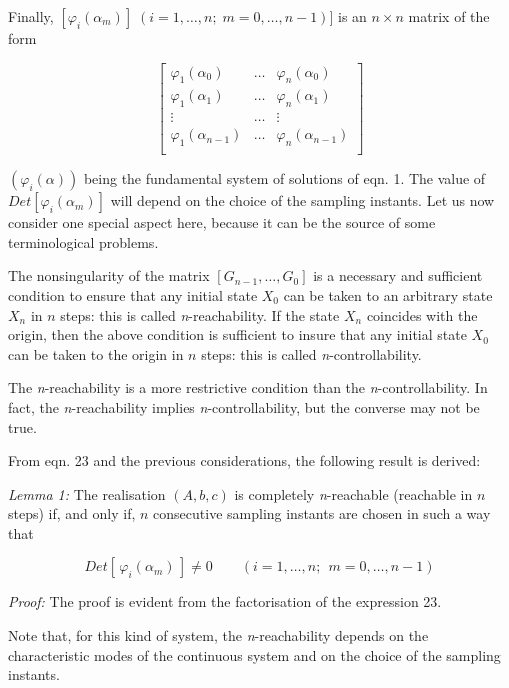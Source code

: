 \documentclass{article}
\begin{document}
Finally, $[\varphi_i(\alpha_m)] \; (i = 1, \ldots , n; \; m = 0,
\ldots , n - 1)]$ is an $n \times n$ matrix of the form


\begin{equation}\label{eq:27}
\left[\begin{array}{ccc}
  \varphi_1(\alpha_0) & \ldots & \varphi_n(\alpha_0) \\
  \varphi_1(\alpha_1) & \ldots & \varphi_n(\alpha_1) \\
  \vdots & \ldots & \vdots \\
  \varphi_1(\alpha_{n-1}) & \ldots & \varphi_n(\alpha_{n-1}) \\
\end{array}\right]
\end{equation}

$(\varphi_i(\alpha))$ being the fundamental system of solutions of
eqn. 1. The value of $Det[\varphi_i(\alpha_m)]$ will depend on the
choice of the sampling instants. Let us now consider one special
aspect here, because it can be the source of some terminological
problems.

The nonsingularity of the matrix $[G_{n-1}, \ldots , G_0]$ is a
necessary and sufficient condition to ensure that any initial
state $X_0$ can be taken to an arbitrary state $X_n$ in $n$ steps:
this is called \textit{n}-reachability. If the state $X_n$
coincides with the origin, then the above condition is sufficient
to insure that any initial state $X_0$ can be taken to the origin
in $n$ steps: this is called \textit{n}-controllability.

The \textit{n}-reachability is a more restrictive condition than
the \textit{n}-controllability. In fact, the
\textit{n}-reachability implies \textit{n}-controllability, but
the converse may not be true.

From eqn. 23 and the previous considerations, the following result
is derived:

\textit{Lemma 1:} The realisation $(A, b, c)$ is completely
\textit{n}-reachable (reachable in $n$ steps) if, and only if, $n$
consecutive sampling instants are chosen in such a way that

\begin{equation}\label{eq:28}
Det[\,\varphi_i(\alpha_m)\,]\neq 0 \qquad (i = 1, \ldots, n;\; \, m = 0, \ldots, n-1)
\end{equation}

\textit{Proof:} The proof is evident from the factorisation of the
expression 23.

Note that, for this kind of system, the \textit{n}-reachability
depends on the characteristic modes of the continuous system and
on the choice of the sampling instants.
\end{document}
